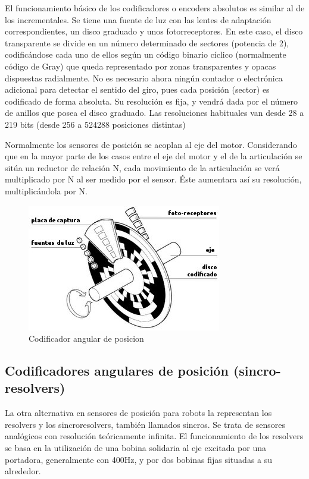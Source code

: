 El funcionamiento básico de los codificadores o encoders absolutos es similar al de los incrementales. Se tiene una fuente de luz con las lentes de adaptación correspondientes, un disco graduado y unos fotorreceptores. En este caso, el disco transparente se divide en un número determinado de sectores (potencia de 2), codificándose cada uno de ellos según un código binario cíclico (normalmente código de Gray) que queda representado por zonas transparentes y opacas dispuestas radialmente. No es necesario ahora ningún contador o electrónica adicional para detectar el sentido del giro, pues cada posición (sector) es codificado de forma absoluta. Su resolución es fija, y vendrá dada por el número de anillos que posea el disco graduado. Las resoluciones habituales van desde 28 a 219 bits (desde 256 a 524288 posiciones distintas)

Normalmente los sensores de posición se acoplan al eje del motor. Considerando que en la mayor parte de los casos entre el eje del motor y el de la articulación se sitúa un reductor de relación N, cada movimiento de la articulación se verá multiplicado por N al ser medido por el sensor. Éste aumentara así su resolución, multiplicándola por N.

\begin{figure}[h]
	\centering
	\includegraphics[width=0.7\linewidth]{img/codificador angular 2.jpg}
	\caption{Codificador angular de posicion}
	\label{fig:insertarimagen}
\end{figure}

\subsection{Codificadores angulares de posición (sincro-resolvers)}

La otra alternativa en sensores de posición para robots la representan los resolvers y los sincroresolvers, también llamados sincros. Se trata de sensores analógicos con resolución teóricamente infinita. El funcionamiento de los resolvers se basa en la utilización de una bobina solidaria al eje excitada por una portadora, generalmente con 400Hz, y por dos bobinas fijas situadas a su alrededor.

